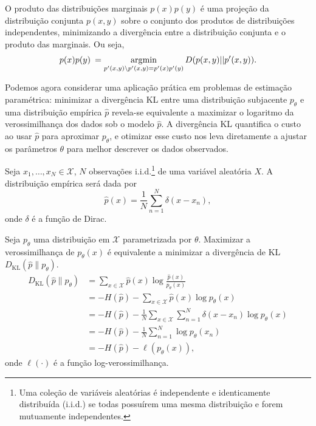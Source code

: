 O produto das distribuições marginais $p(x)p(y)$ é uma projeção da distribuição
conjunta $p(x,y)$ sobre o conjunto dos produtos de distribuições independentes,
minimizando a divergência entre a distribuição conjunta e o produto das marginais.
Ou seja,
\begin{equation}
p(x)p(y) \: = \operatorname*{\arg\!\min}_{p'(x,y) \backslash p'(x,y)=p'(x)p'(y)} D(p(x,y)||p'(x,y)) .
\end{equation}


Podemos agora considerar uma aplicação prática em problemas de estimação paramétrica:
minimizar a divergência KL entre uma distribuição subjacente $p_\theta$ e uma distribuição empírica $\hat{p}$
revela-se equivalente a maximizar o logaritmo da verossimilhança dos dados sob o modelo $\hat{p}$.
A divergência KL quantifica o custo ao usar $\hat{p}$ para aproximar $p_\theta$, 
e otimizar esse custo nos leva diretamente a ajustar os parâmetros $\theta$ para melhor descrever os dados observados.

Seja $x_1, \ldots, x_N \in \mathcal{X}$, $N$ observações i.i.d.\footnote{Uma coleção de variáveis aleatórias é
independente e identicamente distribuída (i.i.d.) se todas possuírem uma mesma distribuição e forem mutuamente independentes.} 
de uma variável aleatória $X$. A distribuição empírica será dada por
\begin{equation}
\hat{p}(x) = \frac{1}{N} \sum_{n=1}^{N} \delta(x - x_n) ,
\end{equation}
onde $\delta$ é a função de Dirac.

Seja $p_\theta$ uma distribuição em $\mathcal{X}$ parametrizada por $\theta$.
Maximizar a verossimilhança de $p_\theta(x)$ é equivalente a minimizar a divergência de KL
$D_\mathrm{KL}(\hat{p} \parallel p_\theta)$.
\begin{subequations}\label{eq:dvmleext}
\begin{align}
  D_\mathrm{KL}(\hat{p} \parallel p_\theta) &= \sum_{x \in \mathcal{X}} \hat{p}(x) \log \frac{\hat{p}(x)}{p_\theta(x)} \\
        &= -H(\hat{p}) - \sum_{x \in \mathcal{X}} \hat{p}(x) \log p_\theta(x) \\
        &= -H(\hat{p}) - \frac{1}{N} \sum_{x \in \mathcal{X}} \sum_{n=1}^{N} \delta(x - x_n) \log p_\theta(x) \\
        &= -H(\hat{p}) - \frac{1}{N} \sum_{n=1}^{N} \log p_\theta(x_n) \\
	&= -H(\hat{p}) - \ell(p_\theta(x)) ,
\end{align}
\end{subequations}
onde $\ell(\cdot)$ é a função log-verossimilhança.


